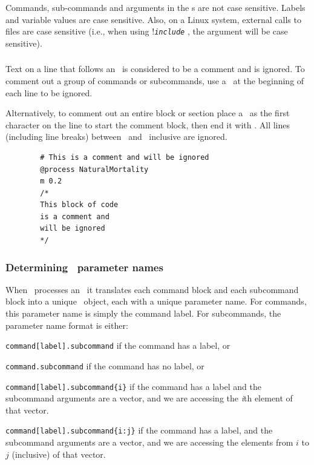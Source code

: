 Commands, sub-commands and arguments in the \config s are not case sensitive. Labels and variable values are case sensitive. Also, on a Linux system, external calls to files are case sensitive (i.e., when using !\texttt{\emph{include}} , the argument  will be case sensitive). 


\subsubsection{}
Text on a line that follows an \commentline\ is considered to be a comment and is ignored. To comment out a group of commands or subcommands, use a \commentline\ at the beginning of each line to be ignored.

Alternatively, to comment out an entire block or section place a \commentstart\ as the first character on the line to start the comment block, then end it with \commentend. All lines (including line breaks) between \commentstart\ and \commentend\ inclusive are ignored. 
{\small{\begin{verbatim}
		# This is a comment and will be ignored
		@process NaturalMortality
		m 0.2
		/* 
		This block of code 
		is a comment and
		will be ignored
		*/
		\end{verbatim}}}

\subsubsection{Determining \IBM\ parameter names\label{sec:parameter-names}}

When \IBM\ processes an \config\ it translates each command block and each subcommand block into a unique \IBM\ object, each with a unique parameter name. For commands, this parameter name is simply the command label. For subcommands, the parameter name format is either: 

\begin{description}
\item \texttt{command[label].subcommand} if the command has a label, or
\item \texttt{command.subcommand} if the command has no label, or
\item \texttt{command[label].subcommand\{i\}} if the command has a label and the subcommand arguments are a vector, and we are accessing the  \emph{i}th element of that vector. 
\item \texttt{command[label].subcommand\{i:j\}} if the command has a label, and the subcommand arguments are a vector, and we are accessing the elements from $i$ to $j$ (inclusive) of that vector.
\end{description} 

